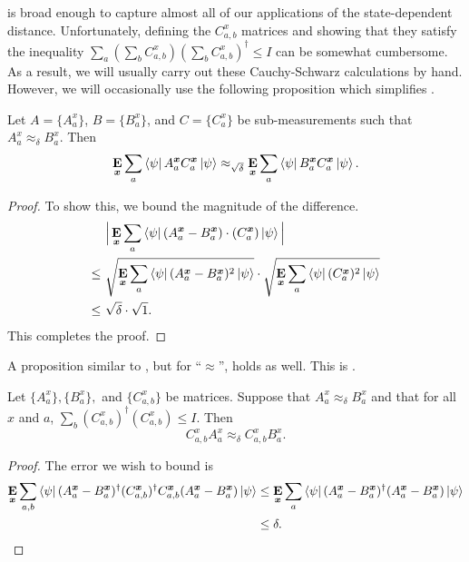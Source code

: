  is broad enough to capture
almost all of our applications of the state-dependent distance.
Unfortunately, defining the $C^x_{a, b}$ matrices and showing that 
they satisfy the inequality $\sum_a (\sum_b C^x_{a,b}) (\sum_b C^x_{a,b})^\dagger  \leq I$
can be somewhat cumbersome.
As a result, we will usually carry out these Cauchy-Schwarz calculations by hand.
However, we will occasionally use the following proposition
which simplifies .

\begin{proposition}\label{prop:easy-approx-from-approx-delta}
Let $A = \{A^x_a\}$, $B = \{B^x_a\}$, and $C = \{C^x_a\}$ be sub-measurements
such that $A^x_a \approx_{\delta} B^x_a$. Then
\begin{equation*}
\mathop{\bf E\/}_{{\boldsymbol{x}}} \sum_a \bra{\psi} A^{{\boldsymbol{x}}}_a  C^{{\boldsymbol{x}}}_a \ket{\psi}
\approx_{\sqrt{\delta}} \mathop{\bf E\/}_{{\boldsymbol{x}}} \sum_a \bra{\psi} B^{{\boldsymbol{x}}}_a  C^{{\boldsymbol{x}}}_a \ket{\psi}.
\end{equation*}
\end{proposition}
\begin{proof}
To show this, we bound the magnitude of the difference.
\begin{align*}
&\Big| \mathop{\bf E\/}_{{\boldsymbol{x}}} \sum_a \bra{\psi} (A^{{\boldsymbol{x}}}_a - B^{{\boldsymbol{x}}}_a) \cdot (C^{{\boldsymbol{x}}}_a) \ket{\psi}\Big|\\
\leq~& \sqrt{\mathop{\bf E\/}_{{\boldsymbol{x}}} \sum_a \bra{\psi} (A^{{\boldsymbol{x}}}_a - B^{{\boldsymbol{x}}}_a)^2 \ket{\psi}}
	\cdot \sqrt{\mathop{\bf E\/}_{{\boldsymbol{x}}} \sum_a \bra{\psi} (C^{{\boldsymbol{x}}}_a)^2 \ket{\psi}}\\
\leq~& \sqrt{\delta} \cdot \sqrt{1}.
\end{align*}
This completes the proof.
\end{proof}

A proposition similar to ,
but for  ``$\approx$'',
holds as well.
    This is \cite[Fact~$4.20$]{NW19}.
    \begin{proposition}
      \label{prop:cab-approx-delta}
      Let $\{A^x_a\}, \{B^x_a\},$ and $\{C^x_{a,b}\}$ be
      matrices. Suppose that $A^{x}_a \approx_\delta B^{x}_a$ and that
      for all $x$ and $a$, $\sum_b (C^{x}_{a,b})^\dagger
      (C^{x}_{a,b}) \leq I$. Then
      \[ C^{x}_{a,b} A^x_{a} \approx_{\delta} C^{x}_{a,b} B^{x}_a. \]
    \end{proposition}
    \begin{proof}
      The error we wish to bound is
      \begin{align*}
        \mathop{\bf E\/}_{{\boldsymbol{x}}} \sum_{a,b} \bra{\psi} 
        (A^{{\boldsymbol{x}}}_a - B^{{\boldsymbol{x}}}_a)^\dagger
        (C^{{\boldsymbol{x}}}_{a,b})^\dagger C^{{\boldsymbol{x}}}_{a,b} (A^{{\boldsymbol{x}}}_a - 
        B^{{\boldsymbol{x}}}_a) \ket{\psi} &\leq \mathop{\bf E\/}_{{\boldsymbol{x}}} \sum_{a} \bra{\psi}
                                (A^{{\boldsymbol{x}}}_a - B^{{\boldsymbol{x}}}_a)^\dagger
                                (A^{{\boldsymbol{x}}}_a - B^{{\boldsymbol{x}}}_a) \ket{\psi} \\
                              &\leq \delta. \qedhere
      \end{align*}
    \end{proof}


